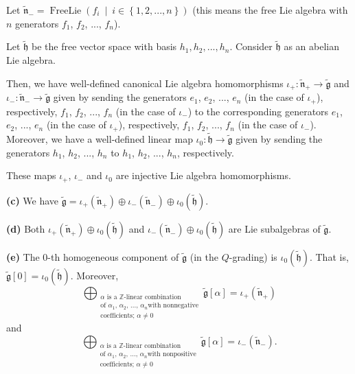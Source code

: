 \documentclass[etingof-lie.tex]{subfiles}
\begin{document}
\begin{theorem}
Let $\widetilde{\mathfrak{n}}_{-}=\operatorname*{FreeLie}\left(  f_{i}%
\ \mid\ i\in\left\{  1,2,...,n\right\}  \right)  $ (this means the free Lie
algebra with $n$ generators $f_{1}$, $f_{2}$, $...$, $f_{n}$).

Let $\widetilde{\mathfrak{h}}$ be the free vector space with basis
$h_{1},h_{2},...,h_{n}$. Consider $\widetilde{\mathfrak{h}}$ as an abelian Lie algebra.

Then, we have well-defined canonical Lie algebra homomorphisms $\iota
_{+}:\widetilde{\mathfrak{n}}_{+}\rightarrow\widetilde{\mathfrak{g}}$ and
$\iota_{-}:\widetilde{\mathfrak{n}}_{-}\rightarrow\widetilde{\mathfrak{g}}$
given by sending the generators $e_{1}$, $e_{2}$, $...$, $e_{n}$ (in the case
of $\iota_{+}$), respectively, $f_{1}$, $f_{2}$, $...$, $f_{n}$ (in the case
of $\iota_{-}$) to the corresponding generators $e_{1}$, $e_{2}$, $...$,
$e_{n}$ (in the case of $\iota_{+}$), respectively, $f_{1}$, $f_{2}$, $...$,
$f_{n}$ (in the case of $\iota_{-}$). Moreover, we have a well-defined linear
map $\iota_{0}:\widetilde{\mathfrak{h}}\rightarrow\widetilde{\mathfrak{g}}$
given by sending the generators $h_{1}$, $h_{2}$, $...$, $h_{n}$ to $h_{1}$,
$h_{2}$, $...$, $h_{n}$, respectively.

These maps $\iota_{+}$, $\iota_{-}$ and $\iota_{0}$ are injective Lie algebra homomorphisms.

\textbf{(c)} We have $\widetilde{\mathfrak{g}}=\iota_{+}\left(
\widetilde{\mathfrak{n}}_{+}\right)  \oplus\iota_{-}\left(
\widetilde{\mathfrak{n}}_{-}\right)  \oplus\iota_{0}\left(
\widetilde{\mathfrak{h}}\right)  $.

\textbf{(d)} Both $\iota_{+}\left(  \widetilde{\mathfrak{n}}_{+}\right)
\oplus\iota_{0}\left(  \widetilde{\mathfrak{h}}\right)  $ and $\iota
_{-}\left(  \widetilde{\mathfrak{n}}_{-}\right)  \oplus\iota_{0}\left(
\widetilde{\mathfrak{h}}\right)  $ are Lie subalgebras of
$\widetilde{\mathfrak{g}}$.

\textbf{(e)} The $0$-th homogeneous component of $\widetilde{\mathfrak{g}}$
(in the $Q$-grading) is $\iota_{0}\left(  \widetilde{\mathfrak{h}}\right)  $.
That is, $\widetilde{\mathfrak{g}}\left[  0\right]  =\iota_{0}\left(
\widetilde{\mathfrak{h}}\right)  $. Moreover,%
\[
\bigoplus_{\substack{\alpha\text{ is a }\mathbb{Z}\text{-linear combination}%
\\\text{of }\alpha_{1}\text{, }\alpha_{2}\text{, }...\text{, }\alpha_{n}\text{
with nonnegative}\\\text{coefficients; }\alpha\neq0}}\widetilde{\mathfrak{g}%
}\left[  \alpha\right]  =\iota_{+}\left(  \widetilde{\mathfrak{n}}_{+}\right)
\]
and%
\[
\bigoplus_{\substack{\alpha\text{ is a }\mathbb{Z}\text{-linear combination}%
\\\text{of }\alpha_{1}\text{, }\alpha_{2}\text{, }...\text{, }\alpha_{n}\text{
with nonpositive}\\\text{coefficients; }\alpha\neq0}}\widetilde{\mathfrak{g}%
}\left[  \alpha\right]  =\iota_{-}\left(  \widetilde{\mathfrak{n}}_{-}\right)
.
\]



\end{theorem}
\end{document}
